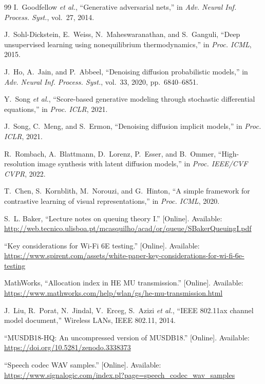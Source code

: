 \documentclass[lettersize,journal]{IEEEtran}
\begin{document}
\begin{thebibliography}{99}
 I.~Goodfellow \emph{et al.}, ``Generative adversarial nets,'' in \emph{Adv. Neural Inf. Process. Syst.}, vol.~27, 2014.

 J.~Sohl-Dickstein, E.~Weiss, N.~Maheswaranathan, and S.~Ganguli, ``Deep unsupervised learning using nonequilibrium thermodynamics,'' in \emph{Proc. ICML}, 2015.

 J.~Ho, A.~Jain, and P.~Abbeel, ``Denoising diffusion probabilistic models,'' in \emph{Adv. Neural Inf. Process. Syst.}, vol.~33, 2020, pp.~6840--6851.

 Y.~Song \emph{et al.}, ``Score-based generative modeling through stochastic differential equations,'' in \emph{Proc. ICLR}, 2021.

 J.~Song, C.~Meng, and S.~Ermon, ``Denoising diffusion implicit models,'' in \emph{Proc. ICLR}, 2021.

 R.~Rombach, A.~Blattmann, D.~Lorenz, P.~Esser, and B.~Ommer, ``High-resolution image synthesis with latent diffusion models,'' in \emph{Proc. IEEE/CVF CVPR}, 2022.

 T.~Chen, S.~Kornblith, M.~Norouzi, and G.~Hinton, ``A simple framework for contrastive learning of visual representations,'' in \emph{Proc. ICML}, 2020.

 S.~L. Baker, ``Lecture notes on queuing theory I.'' [Online]. Available: \url{http://web.tecnico.ulisboa.pt/mcasquilho/acad/or/queue/SBakerQueuingI.pdf}

 ``Key considerations for Wi-Fi 6E testing.'' [Online]. Available: \url{https://www.spirent.com/assets/white-paper-key-considerations-for-wi-fi-6e-testing}

 MathWorks, ``Allocation index in HE MU transmission.'' [Online]. Available: \url{https://www.mathworks.com/help/wlan/gs/he-mu-transmission.html}

 J.~Liu, R.~Porat, N.~Jindal, V.~Erceg, S.~Azizi \emph{et al.}, ``IEEE 802.11ax channel model document,'' Wireless LANs, IEEE 802.11, 2014.

 ``MUSDB18-HQ: An uncompressed version of MUSDB18.'' [Online]. Available: \url{https://doi.org/10.5281/zenodo.3338373}

 ``Speech codec WAV samples.'' [Online]. Available: \url{https://www.signalogic.com/index.pl?page=speech_codec_wav_samples}


\end{thebibliography}
\end{document}
